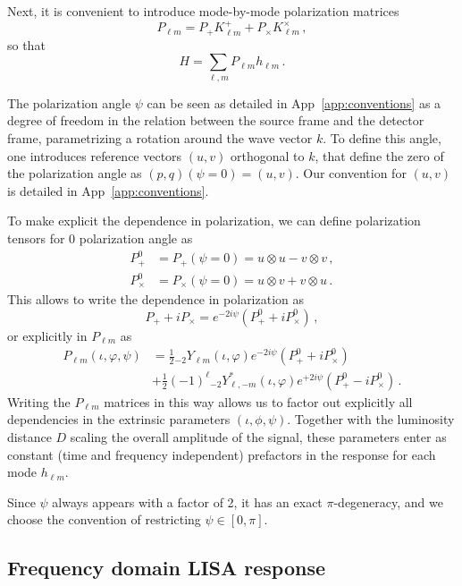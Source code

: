 \documentclass[aps,showpacs,twocolumn,prd,superscriptaddress,nofootinbib]{revtex4-1}
\newcommand{\be}{\begin{equation}}
\newcommand{\ee}{\end{equation}}
\newcommand{\bsub}{\begin{subequations}}
\newcommand{\esub}{\end{subequations}}
\newcommand{\nn}{\nonumber}
\newcommand{\sYlm}{{}_{-2}Y_{\ell m}}
\newcommand{\sYlminusmstar}{{}_{-2}Y_{\ell, -m}^{*}}
\begin{document}
Next, it is convenient to introduce mode-by-mode polarization matrices
\be
	P_{\ell m} = P_{+} K_{\ell m}^{+} + P_{\times} K_{\ell m}^{\times} \,,
\ee
so that
\be\label{eq:Hsummodes}
	H = \sum_{\ell, m} P_{\ell m} h_{\ell m} \,.
\ee

The polarization angle $\psi$ can be seen as detailed in App~\ref{app:conventions} as a degree of freedom in the relation between the source frame and the detector frame, parametrizing a rotation around the wave vector $k$. To define this angle, one introduces reference vectors $(u,v)$ orthogonal to $k$, that define the zero of the polarization angle as $(p,q)(\psi=0) = (u,v)$. Our convention for $(u,v)$ is detailed in App~\ref{app:conventions}.

To make explicit the dependence in polarization, we can define polarization tensors for 0 polarization angle as
\bsub
\begin{align}
	P_{+}^{0} &= P_{+}(\psi = 0) = u \otimes u - v \otimes v \,,\\
	P_{\times}^{0} &= P_{\times}(\psi = 0) = u \otimes v + v \otimes u \,.
\end{align}
\esub
This allows to write the dependence in polarization as
\be
	P_{+} + i P_{\times} = e^{-2 i \psi} \left( P_{+}^{0} + i P_{\times}^{0} \right) \,,
\ee
or explicitly in $P_{\ell m}$ as
\begin{align}
	P_{\ell m} (\iota, \varphi, \psi) &= \frac{1}{2} \sYlm(\iota, \varphi) e^{-2 i \psi} \left( P_{+}^{0} + i P_{\times}^{0} \right) \nn\\
	& + \frac{1}{2} (-1)^{\ell} \sYlminusmstar (\iota, \varphi) e^{+2 i \psi} \left( P_{+}^{0} - i P_{\times}^{0} \right) \,.
\end{align}
Writing the $P_{\ell m}$ matrices in this way allows us to factor out explicitly all dependencies in the extrinsic parameters $(\iota, \phi, \psi)$. Together with the luminosity distance $D$ scaling the overall amplitude of the signal, these parameters enter as constant (time and frequency independent) prefactors in the response for each mode $h_{\ell m}$.

Since $\psi$ always appears with a factor of 2, it has an exact $\pi$-degeneracy, and we choose the convention of restricting $\psi \in [0,\pi]$.


\subsection{Frequency domain LISA response}
\label{subsec:FDresponse}
\end{document}
